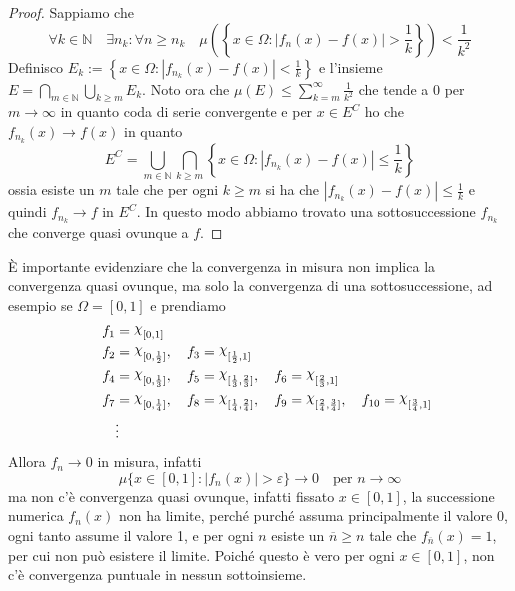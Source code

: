 \begin{proof}
    Sappiamo che
    \[
        \forall k \in \mathbb{N} \quad \exists n_k : \forall n \ge n_k \quad \mu
        {\left( \left\{ x \in \Omega : \left| f_{n}{(x)} - f{(x)}\right| >
        \frac{1}{k} \right\}  \right)} < \frac{1}{k^2}
    \]
    Definisco \(\displaystyle E_k := \left\{ x \in \Omega : \left| f_{n_k}{(x)}
    - f{(x)}\right| < \frac{1}{k} \right\}  \) e l'insieme \(\displaystyle E =
    \bigcap_{m \in \mathbb{N}} \bigcup_{k \ge m} E_k\). Noto ora che
    \(\displaystyle \mu{\left( E \right)} \le \sum_{k=m}^{\infty}
    \frac{1}{k^2}\) che tende a \(0\) per \(m\to \infty\) in quanto coda di
    serie convergente e per \(x \in E^{C}\) ho che \(f_{n_k}{(x)} \to f{(x)}\)
    in quanto 
    \[
        E^{C} = \bigcup_{m \in \mathbb{N}} \bigcap_{k \ge m} \left\{ x \in
        \Omega : \left| f_{n_k} {(x)} - f{(x)}  \right| \le \frac{1}{k} \right\} 
    \]
    ossia esiste un \(m\) tale che per ogni \(k \ge m\) si ha che
    \(|f_{n_k}{(x)} - f{(x)} | \le \frac{1}{k}\) e quindi \(f_{n_k} \to f\) in
    \(E^{C}\).
    In questo modo abbiamo trovato una sottosuccessione \(f_{n_k}\) che converge quasi
    ovunque a \(f\).
\end{proof}
\begin{example}
    È importante evidenziare che la convergenza in misura non implica la
    convergenza quasi ovunque, ma solo la convergenza di una sottosuccessione,
    ad esempio se \(\Omega = [0, 1]\) e prendiamo
\begin{align*}
    f_{1} &= \rchi_{[0, 1]} \\ \quad f_{2} &= \rchi_{[0, \frac{1}{2}]}, \quad f_{3} =
    \rchi_{[\frac{1}{2}, 1]} \\
    f_{4} &= \rchi_{[0, \frac{1}{3}]}, \quad f_{5} = \rchi_{[\frac{1}{3},
    \frac{2}{3}]}, \quad f_{6} = \rchi_{[\frac{2}{3}, 1]} \\ 
    f_{7} &= \rchi_{[0, \frac{1}{4}]}, \quad f_{8} = \rchi_{[\frac{1}{4},
    \frac{2}{4}]}, \quad f_{9} = \rchi_{[\frac{2}{4}, \frac{3}{4}]}, \quad
    f_{10} = \rchi_{[\frac{3}{4}, 1]}   \\
          &\vdots
\end{align*}
    Allora \(f_{n} \to 0\) in misura, infatti 
    \[
        \mu{\{ x \in [0,1] : |f_{n}{(x)}| > \varepsilon\}} \to 0 \quad \text{per
        \(n\to \infty\)}
    \]
    ma non c'è convergenza quasi ovunque, infatti fissato \(x \in [0,1]\), la
    successione numerica \(f_{n}{(x)}\) non ha limite, perché purché assuma
    principalmente il valore 0, ogni tanto assume il valore 1, e per ogni \(n\)
    esiste un \(\overline{n} \ge  n\) tale che \(f_{\overline{n}} {(x)} = 1 \),
    per cui non può esistere il limite. Poiché questo è vero per ogni \(x \in
    [0,1]\), non c'è convergenza puntuale in nessun sottoinsieme.
\end{example}
